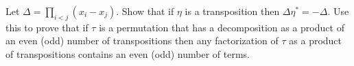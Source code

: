 Let $\Delta = \prod_{i<j} (x_i - x_j)$. Show that if $\eta$ is a transposition then $\Delta \eta^* = -\Delta$. Use this to prove that if $\tau$ is a permutation that has a decomposition as a product of an even (odd) number of transpositions then any factorization of $\tau$ as a product of transpositions contains an even (odd) number of terms.